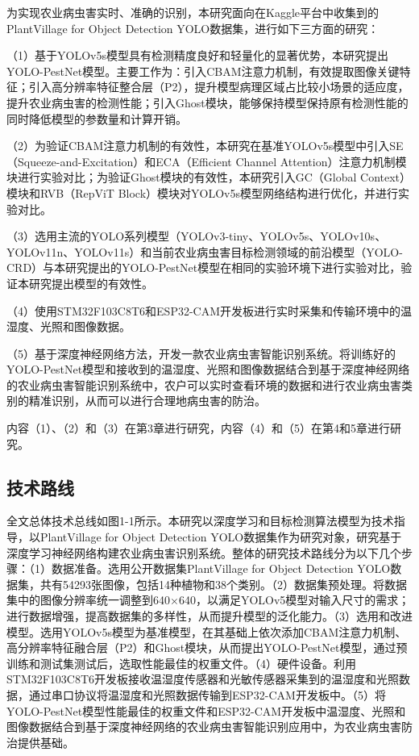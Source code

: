 \documentclass[12pt, a4paper, twoside]{ctexart}
\begin{document}
为实现农业病虫害实时、准确的识别，本研究面向在Kaggle平台中收集到的PlantVillage for Object Detection YOLO数据集，进行如下三方面的研究：

（1）基于YOLOv5s模型具有检测精度良好和轻量化的显著优势，本研究提出YOLO-PestNet模型。主要工作为：引入CBAM注意力机制，有效提取图像关键特征；引入高分辨率特征整合层（P2），提升模型病理区域占比较小场景的适应度，提升农业病虫害的检测性能；引入Ghost模块，能够保持模型保持原有检测性能的同时降低模型的参数量和计算开销。

（2）为验证CBAM注意力机制的有效性，本研究在基准YOLOv5s模型中引入SE（Squeeze-and-Excitation）和ECA（Efficient Channel Attention）注意力机制模块进行实验对比；为验证Ghost模块的有效性，本研究引入GC（Global Context）模块和RVB（RepViT Block）模块对YOLOv5s模型网络结构进行优化，并进行实验对比。

（3）选用主流的YOLO系列模型（YOLOv3-tiny、YOLOv5s、YOLOv10s、YOLOv11n、YOLOv11s）和当前农业病虫害目标检测领域的前沿模型（YOLO-CRD）与本研究提出的YOLO-PestNet模型在相同的实验环境下进行实验对比，验证本研究提出模型的有效性。

（4）使用STM32F103C8T6和ESP32-CAM开发板进行实时采集和传输环境中的温湿度、光照和图像数据。

（5）基于深度神经网络方法，开发一款农业病虫害智能识别系统。将训练好的YOLO-PestNet模型和接收到的温湿度、光照和图像数据结合到基于深度神经网络的农业病虫害智能识别系统中，农户可以实时查看环境的数据和进行农业病虫害类别的精准识别，从而可以进行合理地病虫害的防治。

内容（1）、（2）和（3）在第3章进行研究，内容（4）和（5）在第4和5章进行研究。


\subsection{技术路线}

全文总体技术总线如图1-1所示。本研究以深度学习和目标检测算法模型为技术指导，以PlantVillage for Object Detection YOLO数据集作为研究对象，研究基于深度学习神经网络构建农业病虫害识别系统。整体的研究技术路线分为以下几个步骤：（1）数据准备。选用公开数据集PlantVillage for Object Detection YOLO数据集，共有54293张图像，包括14种植物和38个类别。（2）数据集预处理。将数据集中的图像分辨率统一调整到640×640，以满足YOLOv5模型对输入尺寸的需求；进行数据增强，提高数据集的多样性，从而提升模型的泛化能力。（3）选用和改进模型。选用YOLOv5s模型为基准模型，在其基础上依次添加CBAM注意力机制、高分辨率特征融合层（P2）和Ghost模块，从而提出YOLO-PestNet模型，通过预训练和测试集测试后，选取性能最佳的权重文件。（4）硬件设备。利用STM32F103C8T6开发板接收温湿度传感器和光敏传感器采集到的温湿度和光照数据，通过串口协议将温湿度和光照数据传输到ESP32-CAM开发板中。（5）将YOLO-PestNet模型性能最佳的权重文件和ESP32-CAM开发板中温湿度、光照和图像数据结合到基于深度神经网络的农业病虫害智能识别应用中，为农业病虫害防治提供基础。
\end{document}
